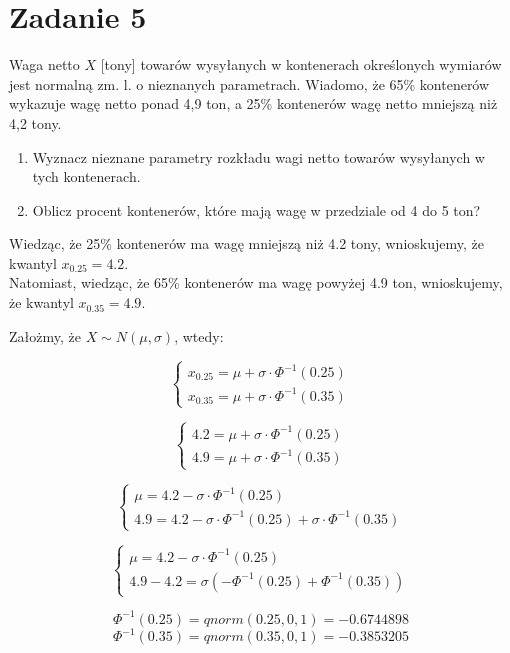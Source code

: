 \documentclass{article}
\begin{document}
\newpage
\section{Zadanie 5}
Waga netto $X$ [tony] towarów wysyłanych w kontenerach określonych wymiarów jest normalną zm. l. o nieznanych parametrach. Wiadomo, że 65\% kontenerów wykazuje wagę netto ponad 4,9 ton, a 25\% kontenerów wagę netto mniejszą niż 4,2 tony.
\begin{enumerate}[label = \alph*)]
\item Wyznacz nieznane parametry rozkładu wagi netto towarów wysyłanych w tych kontenerach.
\item Oblicz procent kontenerów, które mają wagę w przedziale od 4 do 5 ton?
\end{enumerate}
\par

Wiedząc, że 25\% kontenerów ma wagę mniejszą niż 4.2 tony, wnioskujemy, że kwantyl $x_{0.25} = 4.2$.\\
Natomiast, wiedząc, że 65\% kontenerów ma wagę powyżej 4.9 ton, wnioskujemy, że kwantyl $x_{0.35} = 4.9$.\\
\par
Założmy, że $X\sim N(\mu,\sigma)$, wtedy:


$$
\left\{ 
\begin{array}{l}
x_{0.25} = \mu + \sigma\cdot\Phi^{-1}(0.25) \\
x_{0.35} = \mu + \sigma\cdot\Phi^{-1}(0.35)
\end{array}
\right.
$$

$$
\left\{ 
\begin{array}{l}
4.2 = \mu + \sigma\cdot\Phi^{-1}(0.25) \\
4.9 = \mu + \sigma\cdot\Phi^{-1}(0.35)
\end{array}
\right.
$$

$$
\left\{ 
\begin{array}{l}
\mu = 4.2 - \sigma\cdot\Phi^{-1}(0.25) \\
4.9 = 4.2 - \sigma\cdot\Phi^{-1}(0.25) + \sigma\cdot\Phi^{-1}(0.35)
\end{array}
\right.
$$

$$
\left\{ 
\begin{array}{l}
\mu = 4.2 - \sigma\cdot\Phi^{-1}(0.25) \\
4.9 - 4.2 = \sigma (-\Phi^{-1}(0.25) + \Phi^{-1}(0.35))
\end{array}
\right.
$$

$$\Phi^{-1}(0.25) = qnorm(0.25,0,1) = -0.6744898$$
$$\Phi^{-1}(0.35) = qnorm(0.35,0,1) = -0.3853205$$
\end{document}
